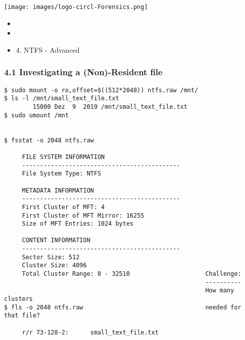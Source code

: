 %
%



\begin{frame}
    \texttt{[image: images/logo-circl-Forensics.png]}
    \begin{itemize}
        \item[]
        \item[]
        \item[] 4. NTFS - Advanced
    \end{itemize}
\end{frame}


\begin{frame}[fragile]
  \frametitle{4.1 Investigating a (Non)-Resident file}
  \begin{lstlisting}[basicstyle=\tiny]
$ sudo mount -o ro,offset=$((512*2048)) ntfs.raw /mnt/
$ ls -l /mnt/small_text_file.txt 
        15000 Dez  9  2019 /mnt/small_text_file.txt
$ sudo umount /mnt


$ fsstat -o 2048 ntfs.raw

     FILE SYSTEM INFORMATION
     --------------------------------------------
     File System Type: NTFS

     METADATA INFORMATION
     --------------------------------------------
     First Cluster of MFT: 4
     First Cluster of MFT Mirror: 16255
     Size of MFT Entries: 1024 bytes

     CONTENT INFORMATION
     --------------------------------------------
     Sector Size: 512
     Cluster Size: 4096
     Total Cluster Range: 0 - 32510                     Challenge:
                                                        ----------
                                                        How many clusters 
$ fls -o 2048 ntfs.raw                                  needed for that file?

     r/r 73-128-2:      small_text_file.txt
  \end{lstlisting}
\end{frame}


